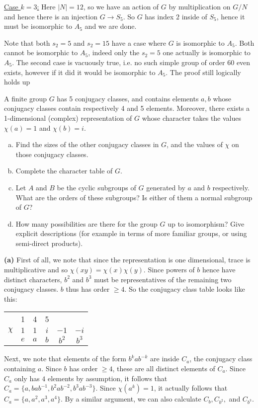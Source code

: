 \documentclass[11pt, letterpaper]{article}
\begin{document}
\underline{Case $k=3$:} Here $|N|=12$, so we have an action of $G$ by multiplication on $G/N$ and hence there is an injection $G\to S_5$. So $G$ has index $2$ inside of $S_5$, hence it must be isomorphic to $A_5$ and we are done. 

Note that both $s_2=5$ and $s_2=15$ have a case where $G$ is isomorphic to $A_5$. Both cannot be isomorphic to $A_5$, indeed only the $s_2=5$ one actually is isomorphic to $A_5$. The second case is vacuously true, i.e. no such simple group of order $60$ even exists, however if it did it would be isomorphic to $A_5$. The proof still logically holds up

\pagebreak
\begin{problem}
    A finite group $G$ has 5 conjugacy classes, and contains elements $a,b$ whose conjugacy classes contain respectively 4 and 5 elements.  Moreover, there exists a 1-dimensional (complex) representation of $G$ whose character takes the values $\chi(a)=1$ and $\chi(b)=i$.
    \begin{enumerate}[(a)]
        \item Find the sizes of the other conjugacy classes in $G$, and the values of $\chi$ on those conjugacy classes.  
        \item Complete the character table of $G$. 
        \item Let $A$ and $B$ be the cyclic subgroups of $G$ generated by $a$ and $b$ respectively. What are the orders of these subgroups? Is either of them a normal subgroup of $G$?
        \item How many possibilities are there for the group $G$ up to isomorphism? Give explicit descriptions (for example in terms of more familiar groups, or using semi-direct products).
    \end{enumerate}
\end{problem}

\textbf{(a)} First of all, we note that since the representation is one dimensional, trace is multiplicative and so $\chi(xy)=\chi(x)\chi(y)$. Since powers of $b$ hence have distinct characters, $b^2$ and $b^3$ must be representatives of the remaining two conjugacy classes. $b$ thus has order $\geq 4$. So the conjugacy class table looks like this:
\begin{center}
    \begin{tabular}{ c|c|c|c|c|c| } 
        &1&4&5&&\\
        $\chi$& $1$& $1$& $i$& $-1$& $-i$\\
        \hline
        &$e$&$a$&$b$&$b^2$&$b^3$\\
    \end{tabular}
\end{center}
Next, we note that elements of the form $b^kab^{-k}$ are inside $C_a$, the conjugacy class containing $a$. Since $b$ has order $\geq 4$, these are all distinct elements of $C_a$. Since $C_a$ only has $4$ elements by assumption, it follows that $C_a=\{a, bab^{-1}, b^2ab^{-2}, b^3ab^{-3}\}$. Since $\chi(a^k)=1$, it actually follows that $C_a=\{a,a^2,a^3,a^4\}$. By a similar argument, we can also calculate $C_b, C_{b^2},$ and $C_{b^3}$.
\end{document}
